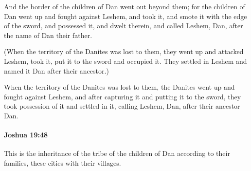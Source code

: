 			\begin{versebox}
					\item[BHS] 
					\item[ASV] And the border of the children of Dan went out beyond them; for the children of Dan went up and fought against Leshem, and took it, and smote it with the edge of the sword, and possessed it, and dwelt therein, and called Leshem, Dan, after the name of Dan their father.
					\item[NIV] (When the territory of the Danites was lost to them, they went up and attacked Leshem, took it, put it to the sword and occupied it. They settled in Leshem and named it Dan after their ancestor.)
					\item[NRSV] When the territory of the Danites was lost to them, the Danites went up and fought against Leshem, and after capturing it and putting it to the sword, they took possession of it and settled in it, calling Leshem, Dan, after their ancestor Dan.
			\end{versebox}

		\paragraph{Joshua 19:48} %
			\label{JOSHUA-19-48}

			This is the inheritance of the tribe of the children of Dan according to their families, these cities with their villages.

